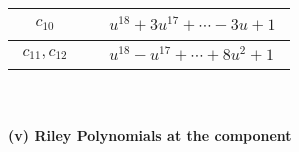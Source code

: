 \documentclass[1p]{elsarticle_modified}
\theoremstyle{definition}
\begin{document}
\begin{tabular}{m{50pt}|m{274pt}}
\hline $$\begin{aligned}c_{10}\end{aligned}$$&$\begin{aligned}
&u^{18}+3 u^{17}+\cdots-3 u+1
\end{aligned}$\\
\hline $$\begin{aligned}c_{11},c_{12}\end{aligned}$$&$\begin{aligned}
&u^{18}- u^{17}+\cdots+8 u^2+1
\end{aligned}$\\
\hline
\end{tabular}\\~\\
\newpage\renewcommand{\arraystretch}{1}
\flushleft \textbf{(v) Riley Polynomials at the component}\newline \\
\end{document}
